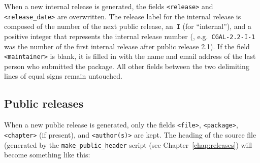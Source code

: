 When a new internal release is generated, 
the fields {\tt <release>} and {\tt <release\_date>} are overwritten. 
The release label for the internal release is composed of the number of the 
next public release, an~{\tt I} (for ``internal''), and a positive integer that 
represents the internal release number (\eg, e.g.~{\tt CGAL-2.2-I-1} was the 
number of the first internal release after public release 2.1).%
If the field {\tt <maintainer>} is blank, it is filled in with the name and
email address of the last person who submitted the package.%
All other fields between the two delimiting 
lines of equal signs remain untouched.

\subsection*{Public releases}

When a new public release is generated, only the fields {\tt <file>},
{\tt <package>}, \mbox{{\tt <chapter>}} (if present), and {\tt <author(s)>}
are kept.  The heading of the source file (generated by the 
\texttt{make\_public\_header} script 
(see Chapter~\ref{chap:releases})
will become something like this:


